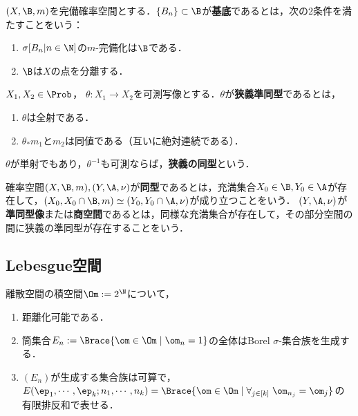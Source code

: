 \documentclass[uplatex,dvipdfmx]{jsreport}
\begin{document}
\begin{definition}
    $(X,\B,m)$を完備確率空間とする．$\{B_n\}\subset\B$が\textbf{基底}であるとは，次の2条件を満たすことをいう：
    \begin{enumerate}
        \item $\sigma[B_n|n\in\N]$の$m$-完備化は$\B$である．
        \item $\B$は$X$の点を分離する．
    \end{enumerate}
\end{definition}

\begin{definition}
    $X_1,X_2\in\Prob$，
    $\theta:X_1\to X_2$を可測写像とする．$\theta$が\textbf{狭義準同型}であるとは，
    \begin{enumerate}
        \item $\theta$は全射である．
        \item $\theta_*m_1$と$m_2$は同値である（互いに絶対連続である）．
    \end{enumerate}
    $\theta$が単射でもあり，$\theta^{-1}$も可測ならば，\textbf{狭義の同型}という．
\end{definition}

\begin{definition}[isomorphic]
    確率空間$(X,\B,m),(Y,\A,\nu)$が\textbf{同型}であるとは，充満集合$X_0\in\B,Y_0\in\A$が存在して，$(X_0,X_0\cap\B,m)\simeq(Y_0,Y_0\cap\A,\nu)$が成り立つことをいう．
    $(Y,\A,\nu)$が\textbf{準同型像}または\textbf{商空間}であるとは，同様な充満集合が存在して，その部分空間の間に狭義の準同型が存在することをいう．
\end{definition}

\subsection{Lebesgue空間}

\begin{proposition}[具体Lebesgue空間]
    離散空間の積空間$\Om:=2^\N$について，
    \begin{enumerate}
        \item 距離化可能である．
        \item 筒集合$E_n:=\Brace{\om\in\Om\mid\om_n=1}$の全体はBorel $\sigma$-集合族を生成する．
        \item $(E_n)$が生成する集合族は可算で，$E(\ep_1,\cdots,\ep_k;n_1,\cdots,n_k)=\Brace{\om\in\Om\mid\forall_{j\in[k]}\;\om_{n_j}=\om_j}$の有限排反和で表せる．
    \end{enumerate}
\end{proposition}
\end{document}
